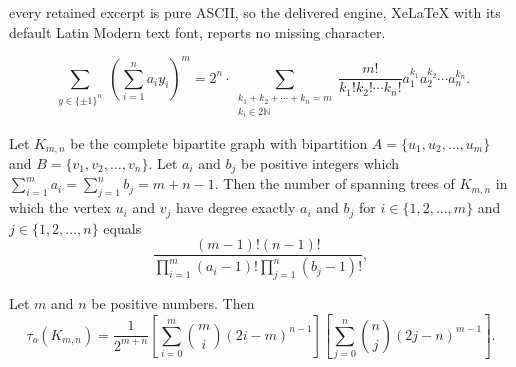 \documentclass[10pt,a4paper]{amsart}
\begin{document}
every retained excerpt is pure ASCII, so the delivered engine, XeLaTeX with its default Latin Modern text font, reports no missing character.
\begin{lemma}\label{bo}
$$
		\sum_{\substack{y \in \{\pm1\}^n}} \left(\sum_{i=1}^n a_i y_i \right)^m=
			2^n\cdot\sum\limits_{\substack{k_1+k_2+\cdots+k_n=m\\k_i\in 2\mathbb{N} }}\frac{m!}{k_1!k_2!\cdots k_n!}a_1^{k_1}a_2^{k_2}\cdots a_n^{k_n}.
$$	
\end{lemma}

\begin{theorem}\label{Kmn-degree}
Let $K_{m,n}$ be the complete bipartite graph with bipartition $A=\{u_1,u_2,\ldots,u_m\}$ and $B=\{v_1,v_2,\ldots,v_n\}$. Let $a_i$ and $b_j$ be positive integers which $\sum_{i=1}^{m}a_i=\sum_{j=1}^{n}b_j=m+n-1$. Then the number of spanning trees of $K_{m,n}$ in which the vertex $u_i$ and $v_j$ have degree exactly $a_i$ and $b_j$ for $i\in\{1,2,\ldots,m\}$ and $j\in\{1,2,\ldots,n\}$ equals 
    $$
	\frac{(m-1)!(n-1)!}{\prod_{i=1}^{m}(a_i-1)!\prod_{j=1}^{n}(b_j-1)!},
	$$
\end{theorem}

\begin{theorem}\label{Kmn}
Let $m$ and $n$ be positive numbers. Then
$$\tau_o(K_{m,n})=\frac{1}{2^{m+n}}\left[\sum_{i=0}^{m}\binom{m}{i}(2i-m)^{n-1}\right]\left[\sum_{j=0}^{n}\binom{n}{j}(2j-n)^{m-1}\right].$$	
\end{theorem}
\end{document}
